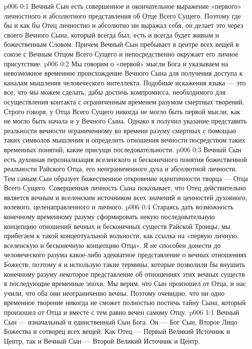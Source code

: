\author{Божественный Советник}
\vs p006 0:1 Вечный Сын есть совершенное и окончательное выражение «первого» личностного и абсолютного представления об Отце Всего Сущего. Поэтому где бы и как бы Отец личностно и абсолютно ни выражал себя, он делает это через своего Вечного Сына, который всегда был, есть и всегда будет живым и божественным Словом. Причем Вечный Сын пребывает в центре всех вещей в союзе с Вечным Отцом Всего Сущего и непосредственно окружает его личное присутствие.
\vs p006 0:2 Мы говорим о «первой» мысли Бога и указываем на невозможное временное происхождение Вечного Сына для получения доступа к каналам мышления человеческого интеллекта. Подобные искажения языка --- это все, что мы можем сделать, дабы достичь компромисса, необходимого для осуществления контакта с ограниченным временем разумом смертных творений. Строго говоря, у Отца Всего Сущего никогда не могло быть первой мысли, как не могло быть начала и у Вечного Сына. Однако я получил указание представить реальности вечности ограниченному во времени разуму смертных с помощью таких символов мышления и определить отношения вечности посредством таких временных понятий, какие присущи последовательности.
\vs p006 0:3 Вечный Сын есть духовная персонализация вселенского и бесконечного понятия божественной реальности Райского Отца, его неограниченного духа и абсолютной личности. Тем самым Сын образует божественное откровение идентичности творца --- Отца Всего Сущего. Совершенная личность Сына показывает, что Отец действительно является вечным и вселенским источником всех значений и ценностей духовного, волевого, целенаправленного и личного.
\vs p006 0:4 Стараясь дать возможность конечному временному разуму сформировать некую последовательную концепцию отношений вечных и бесконечных существ Райской Троицы, мы прибегаем к такой концептуальной вольности, как ссылка на «первую личную, вселенскую и бесконечную концепцию Отца». Я не способен донести до человеческого разума какое\hyp{}либо адекватное представление о вечных отношениях Божеств; поэтому я и использую такие термины, которые позволили бы внушить конечному разуму некоторое представление об отношениях этих вечных существ в последующие временные эпохи. Мы верим, что Сын произошел от Отца, и нас учили, что оба они неограниченно вечны. Поэтому очевидно, что ни одно временное творение никогда не сможет полностью постичь тайну Сына, который произошел от Отца и вместе с тем равно вечен самому Отцу.
\vs p006 1:1 Вечный Сын --- изначальный и единственный Сын Бога. Он --- Бог Сын, Второе Лицо Божества и сотворец всех вещей. Как Отец --- Первый Великий Источник и Центр, так и Вечный Сын --- Второй Великий Источник и Центр.
